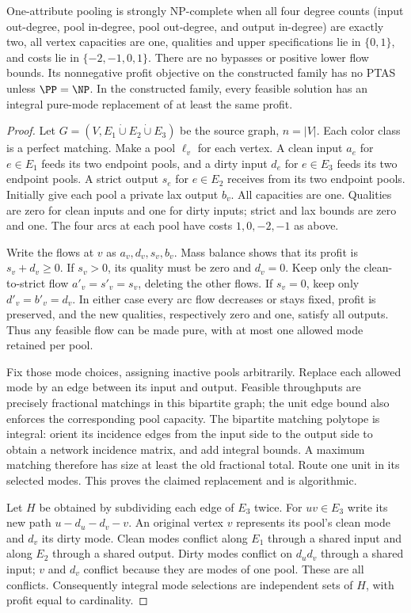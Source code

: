 \begin{theorem}\label{s3:all-two-thm}
One-attribute pooling is strongly NP-complete when all four degree counts
(input out-degree, pool in-degree, pool out-degree, and output in-degree)
are exactly two, all vertex capacities are one, qualities and upper
specifications lie in $\{0,1\}$, and costs lie in $\{-2,-1,0,1\}$.
There are no bypasses or positive lower flow bounds. Its nonnegative
profit objective on the constructed family has no PTAS unless
$\PP=\NP$. In the constructed family, every feasible solution has an integral
pure-mode replacement of at least the same profit.
\end{theorem}
\begin{proof}
Let $G=(V,E_1\mathbin{\dot\cup}E_2\mathbin{\dot\cup}E_3)$ be the
source graph, $n=|V|$. Each color class is a perfect matching. Make a
pool $\ell_v$ for each vertex. A clean input $a_e$ for $e\in E_1$
feeds its two endpoint pools, and a dirty input $d_e$ for $e\in E_3$
feeds its two endpoint pools. A strict output $s_e$ for $e\in E_2$
receives from its two endpoint pools. Initially give each pool a private
lax output $b_v$. All capacities are one. Qualities are zero for clean
inputs and one for dirty inputs; strict and lax bounds are zero and one.
The four arcs at each pool have costs $1,0,-2,-1$ as above.

Write the flows at $v$ as $a_v,d_v,s_v,b_v$. Mass balance shows that
its profit is $s_v+d_v\ge0$. If $s_v>0$, its quality must be zero and
$d_v=0$. Keep only the clean-to-strict flow
$a'_v=s'_v=s_v$, deleting the other flows. If $s_v=0$, keep only
$d'_v=b'_v=d_v$. In either case every arc flow decreases or stays fixed,
profit is preserved, and the new qualities, respectively zero and one,
satisfy all outputs. Thus any feasible flow can be made pure, with at
most one allowed mode retained per pool.

Fix those mode choices, assigning inactive pools arbitrarily. Replace
each allowed mode by an edge between its input and output. Feasible
throughputs are precisely fractional matchings in this bipartite graph;
the unit edge bound also enforces the corresponding pool capacity.
The bipartite matching polytope is integral: orient its incidence edges
from the input side to the output side to obtain a network incidence
matrix, and add integral bounds. A maximum matching therefore has size
at least the old fractional total. Route one unit in its selected modes.
This proves the claimed replacement and is algorithmic.

Let $H$ be obtained by subdividing each edge of $E_3$ twice. For
$uv\in E_3$ write its new path $u-d_u-d_v-v$. An original vertex $v$
represents its pool's clean mode and $d_v$ its dirty mode. Clean modes
conflict along $E_1$ through a shared input and along $E_2$ through a
shared output. Dirty modes conflict on $d_ud_v$ through a shared input;
$v$ and $d_v$ conflict because they are modes of one pool. These are
all conflicts. Consequently integral mode selections are independent
sets of $H$, with profit equal to cardinality.


\end{proof}
